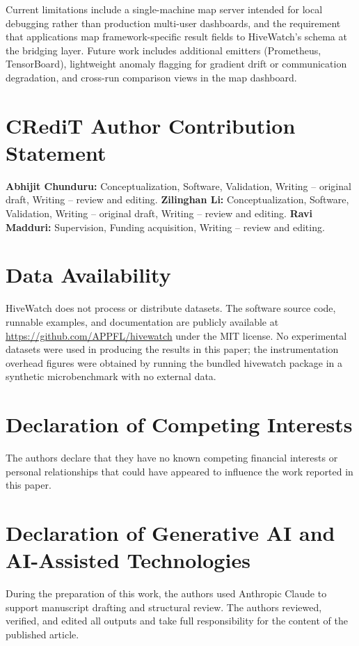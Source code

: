 \documentclass[preprint,12pt, a4paper]{elsarticle}
\begin{document}
Current limitations include a single-machine map server intended for local debugging rather than production multi-user dashboards, and the requirement that applications map framework-specific result fields to HiveWatch's schema at the bridging layer. Future work includes additional emitters (Prometheus, TensorBoard), lightweight anomaly flagging for gradient drift or communication degradation, and cross-run comparison views in the map dashboard.

\section*{CRediT Author Contribution Statement}
\textbf{Abhijit Chunduru:} Conceptualization, Software, Validation, Writing -- original draft, Writing -- review and editing.
\textbf{Zilinghan Li:} Conceptualization, Software, Validation, Writing -- original draft, Writing -- review and editing.
\textbf{Ravi Madduri:} Supervision, Funding acquisition, Writing -- review and editing.

\section*{Data Availability}
HiveWatch does not process or distribute datasets. The software source code, runnable examples, and documentation are publicly available at \url{https://github.com/APPFL/hivewatch} under the MIT license. No experimental datasets were used in producing the results in this paper; the instrumentation overhead figures were obtained by running the bundled hivewatch package in a synthetic microbenchmark with no external data.

\section*{Declaration of Competing Interests}
The authors declare that they have no known competing financial interests or personal relationships that could have appeared to influence the work reported in this paper.

\section*{Declaration of Generative AI and AI-Assisted Technologies}
During the preparation of this work, the authors used Anthropic Claude to support manuscript drafting and structural review. The authors reviewed, verified, and edited all outputs and take full responsibility for the content of the published article.
\end{document}
